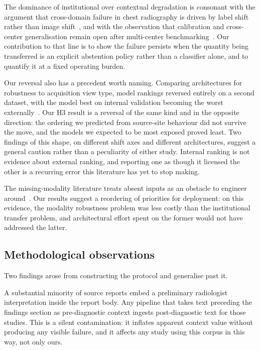 The dominance of institutional over contextual degradation is consonant with
the argument that cross-domain failure in chest radiography is driven by label
shift rather than image shift~\cite{cohen2020limits}, and with the observation
that calibration and cross-center generalisation remain open after multi-center
benchmarking~\cite{cxrlt2026}. Our contribution to that line is to show the
failure persists when the quantity being transferred is an explicit abstention
policy rather than a classifier alone, and to quantify it at a fixed operating
burden.

Our reversal also has a precedent worth naming. Comparing architectures for
robustness to acquisition view type, model rankings reversed entirely on a
second dataset, with the model best on internal validation becoming the worst
externally~\cite{farquhar2026acquisition}. Our H3 result is a reversal of the
same kind and in the opposite direction: the ordering we predicted from
source-site behaviour did not survive the move, and the models we expected to be
most exposed proved least. Two findings of this shape, on different shift axes
and different architectures, suggest a general caution rather than a
peculiarity of either study. Internal ranking is not evidence about external
ranking, and reporting one as though it licensed the other is a recurring error
this literature has yet to stop making.

The missing-modality literature treats absent inputs as an obstacle to engineer
around~\cite{wang2025missing,wang2025moehealth}. Our results suggest a
reordering of priorities for deployment: on this evidence, the modality
robustness problem was less costly than the institutional transfer problem, and
architectural effort spent on the former would not have addressed the latter.

\subsection{Methodological observations}

Two findings arose from constructing the protocol and generalise past it.

A substantial minority of source reports embed a preliminary radiologist
interpretation inside the report body. Any pipeline that takes text preceding
the findings section as pre-diagnostic context ingests post-diagnostic text for
those studies. This is a silent contamination: it inflates apparent context
value without producing any visible failure, and it affects any study using this
corpus in this way, not only ours.


